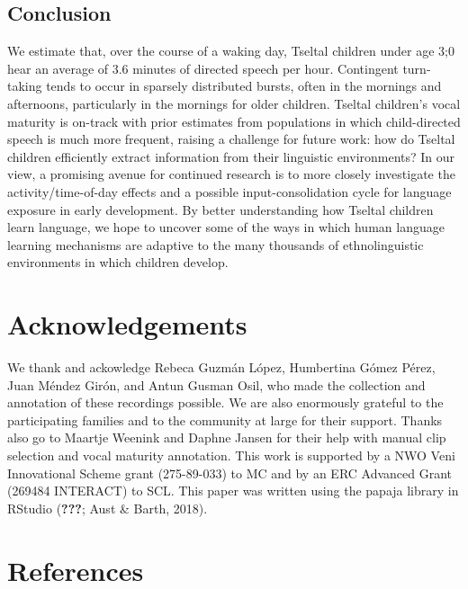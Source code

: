 \documentclass[floatsintext,man]{apa6}
\theoremstyle{definition}
\theoremstyle{definition}
\theoremstyle{definition}
\theoremstyle{remark}
\begin{document}
\subsection{Conclusion}\label{disc-conclusion}

We estimate that, over the course of a waking day, Tseltal children
under age 3;0 hear an average of 3.6 minutes of directed speech per
hour. Contingent turn-taking tends to occur in sparsely distributed
bursts, often in the mornings and afternoons, particularly in the
mornings for older children. Tseltal children's vocal maturity is
on-track with prior estimates from populations in which child-directed
speech is much more frequent, raising a challenge for future work: how
do Tseltal children efficiently extract information from their
linguistic environments? In our view, a promising avenue for continued
research is to more closely investigate the activity/time-of-day effects
and a possible input-consolidation cycle for language exposure in early
development. By better understanding how Tseltal children learn
language, we hope to uncover some of the ways in which human language
learning mechanisms are adaptive to the many thousands of
ethnolinguistic environments in which children develop.

\section{Acknowledgements}\label{acknowledgements}

We thank and ackowledge Rebeca Guzmán López, Humbertina Gómez Pérez,
Juan Méndez Girón, and Antun Gusman Osil, who made the collection and
annotation of these recordings possible. We are also enormously grateful
to the participating families and to the community at large for their
support. Thanks also go to Maartje Weenink and Daphne Jansen for their
help with manual clip selection and vocal maturity annotation. This work
is supported by a NWO Veni Innovational Scheme grant (275-89-033) to MC
and by an ERC Advanced Grant (269484 INTERACT) to SCL. This paper was
written using the papaja library in RStudio ({\textbf{???}}; Aust \&
Barth, 2018).

\newpage

\section{References}\label{refs}

\begingroup
\setlength{\parindent}{-0.5in} \setlength{\leftskip}{0.5in}
\end{document}
